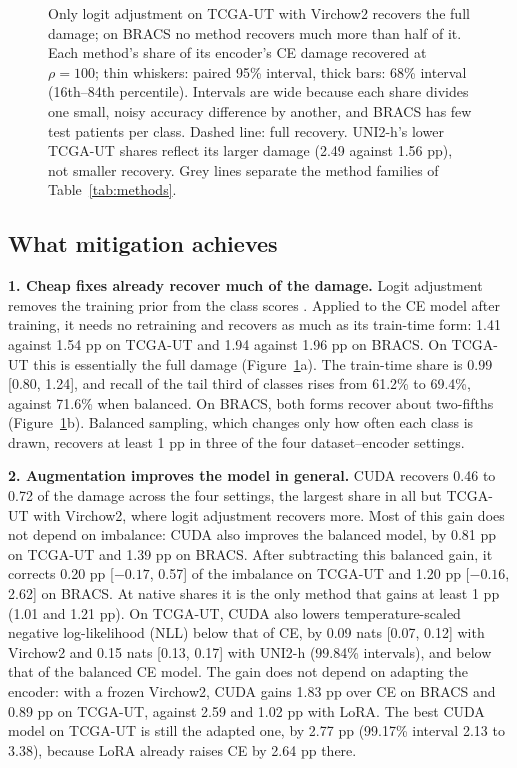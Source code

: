 \documentclass[11pt]{article}
\begin{document}
\begin{figure}[!htb]
\caption{Only logit adjustment on TCGA-UT with Virchow2 recovers the full damage; on BRACS no method recovers much more than half of it. Each method's share of its encoder's CE damage recovered at $\rho=100$; thin whiskers: paired 95\% interval, thick bars: 68\% interval (16th--84th percentile). Intervals are wide because each share divides one small, noisy accuracy difference by another, and BRACS has few test patients per class. Dashed line: full recovery. UNI2-h's lower TCGA-UT shares reflect its larger damage (2.49 against 1.56 pp), not smaller recovery. Grey lines separate the method families of Table~\ref{tab:methods}.}
\label{fig:recovery}
\end{figure}

\subsection{What mitigation achieves}
\label{sec:helps}
\textbf{1. Cheap fixes already recover much of the damage.}
Logit adjustment removes the training prior from the class scores \citep{menon2021longTail}. Applied to the CE model after training, it needs no retraining and recovers as much as its train-time form: 1.41 against 1.54 pp on TCGA-UT and 1.94 against 1.96 pp on BRACS. On TCGA-UT this is essentially the full damage (Figure~\ref{fig:recovery}a). The train-time share is 0.99 [0.80, 1.24], and recall of the tail third of classes rises from 61.2\% to 69.4\%, against 71.6\% when balanced. On BRACS, both forms recover about two-fifths (Figure~\ref{fig:recovery}b). Balanced sampling, which changes only how often each class is drawn, recovers at least 1 pp in three of the four dataset--encoder settings.

\smallskip\noindent\textbf{2. Augmentation improves the model in general.}
CUDA recovers 0.46 to 0.72 of the damage across the four settings, the largest share in all but TCGA-UT with Virchow2, where logit adjustment recovers more. Most of this gain does not depend on imbalance: CUDA also improves the balanced model, by 0.81 pp on TCGA-UT and 1.39 pp on BRACS. After subtracting this balanced gain, it corrects 0.20 pp [$-0.17$, 0.57] of the imbalance on TCGA-UT and 1.20 pp [$-0.16$, 2.62] on BRACS. At native shares it is the only method that gains at least 1 pp (1.01 and 1.21 pp). On TCGA-UT, CUDA also lowers temperature-scaled negative log-likelihood (NLL) below that of CE, by 0.09 nats [0.07, 0.12] with Virchow2 and 0.15 nats [0.13, 0.17] with UNI2-h (99.84\% intervals), and below that of the balanced CE model. The gain does not depend on adapting the encoder: with a frozen Virchow2, CUDA gains 1.83 pp over CE on BRACS and 0.89 pp on TCGA-UT, against 2.59 and 1.02 pp with LoRA. The best CUDA model on TCGA-UT is still the adapted one, by 2.77 pp (99.17\% interval 2.13 to 3.38), because LoRA already raises CE by 2.64 pp there.
\end{document}
